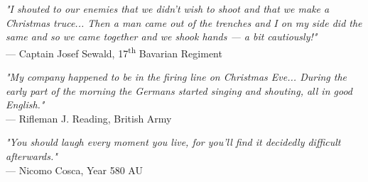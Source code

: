 \begin{flushright}
\emph{"I shouted to our enemies that we didn’t wish to shoot and that we make a Christmas truce... Then a man came out of the trenches and I on my side did the same and so we came together and we shook hands — a bit cautiously!"}\\
— Captain Josef Sewald, 17\textsuperscript{th} Bavarian Regiment
\end{flushright}
\vspace{2em}
\begin{flushright}
\emph{"My company happened to be in the firing line on Christmas Eve... During the early part of the morning the Germans started singing and shouting, all in good English."}\\
— Rifleman J. Reading, British Army
\end{flushright}
\vspace{2em}
\begin{flushright}
\emph{"You should laugh every moment you live, for you'll find it decidedly difficult afterwards."}\\
— Nicomo Cosca, Year 580 AU
\end{flushright}
